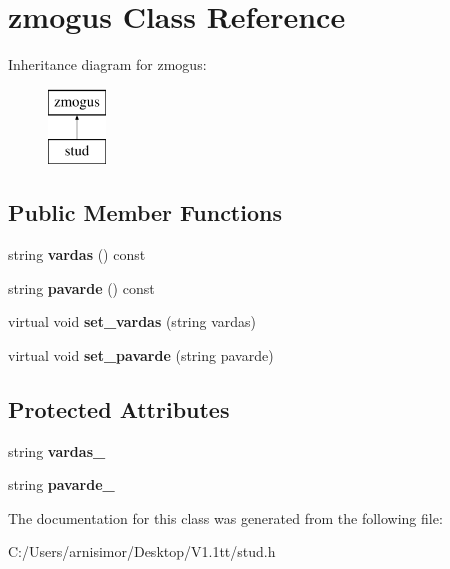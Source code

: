 \hypertarget{classzmogus}{}\section{zmogus Class Reference}
\label{classzmogus}
Inheritance diagram for zmogus\+:\begin{figure}[H]
\begin{center}
\leavevmode
\includegraphics[height=2.000000cm]{classzmogus}
\end{center}
\end{figure}
\subsection*{Public Member Functions}
\begin{DoxyCompactItemize}
\item 
\mbox{\label{classzmogus_a3c272bfac2ad007b42372c2934c39ee9}} 
string {\bfseries vardas} () const
\item 
\mbox{\label{classzmogus_aaa7462a96db6e69b3cec33be0e02c2d3}} 
string {\bfseries pavarde} () const
\item 
\mbox{\label{classzmogus_a21254ab0fd50d3d2150f4342817ddc95}} 
virtual void {\bfseries set\+\_\+vardas} (string vardas)
\item 
\mbox{\label{classzmogus_a867687a7c721258ddb39dcace30c6e84}} 
virtual void {\bfseries set\+\_\+pavarde} (string pavarde)
\end{DoxyCompactItemize}
\subsection*{Protected Attributes}
\begin{DoxyCompactItemize}
\item 
\mbox{\label{classzmogus_ad20a48c056323b41af24f6891e671404}} 
string {\bfseries vardas\+\_\+}
\item 
\mbox{\label{classzmogus_a4df33c060374e0a9853d3fda824f0deb}} 
string {\bfseries pavarde\+\_\+}
\end{DoxyCompactItemize}


The documentation for this class was generated from the following file\+:\begin{DoxyCompactItemize}
\item 
C\+:/\+Users/arnisimor/\+Desktop/\+V1.\+1tt/stud.\+h\end{DoxyCompactItemize}
